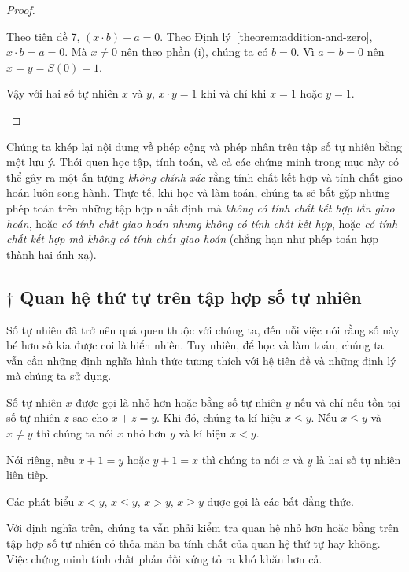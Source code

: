 \begin{proof}
\begin{enumerate}[label={(\roman*)}]
		      Theo tiên đề 7, $(x\cdot b) + a = 0$. Theo Định lý~\ref{theorem:addition-and-zero}, $x\cdot b = a = 0$. Mà $x\ne 0$ nên theo phần (i), chúng ta có $b = 0$. Vì $a = b = 0$ nên $x = y = S(0) = 1$.

		      Vậy với hai số tự nhiên $x$ và $y$, $x\cdot y = 1$ khi và chỉ khi $x = 1$ hoặc $y = 1$.
	\end{enumerate}
\end{proof}

Chúng ta khép lại nội dung về phép cộng và phép nhân trên tập số tự nhiên bằng một lưu ý. Thói quen học tập, tính toán, và cả các chứng minh trong mục này có thể gây ra một ấn tượng \textit{không chính xác} rằng tính chất kết hợp và tính chất giao hoán luôn song hành. Thực tế, khi học và làm toán, chúng ta sẽ bắt gặp những phép toán trên những tập hợp nhất định mà \textit{không có tính chất kết hợp lẫn giao hoán}, hoặc \textit{có tính chất giao hoán nhưng không có tính chất kết hợp}, hoặc \textit{có tính chất kết hợp mà không có tính chất giao hoán} (chẳng hạn như phép toán hợp thành hai ánh xạ).

\subsection{$\dagger$ Quan hệ thứ tự trên tập hợp số tự nhiên}

Số tự nhiên đã trở nên quá quen thuộc với chúng ta, đến nỗi việc nói rằng số này bé hơn số kia được coi là hiển nhiên. Tuy nhiên, để học và làm toán, chúng ta vẫn cần những định nghĩa hình thức tương thích với hệ tiên đề và những định lý mà chúng ta sử dụng.

\begin{definition}
	Số tự nhiên $x$ được gọi là nhỏ hơn hoặc bằng số tự nhiên $y$ nếu và chỉ nếu tồn tại số tự nhiên $z$ sao cho $x + z = y$. Khi đó, chúng ta kí hiệu $x\leq y$. Nếu $x\leq y$ và $x\ne y$ thì chúng ta nói $x$ nhỏ hơn $y$ và kí hiệu $x < y$.

	Nói riêng, nếu $x + 1 = y$ hoặc $y + 1 = x$ thì chúng ta nói $x$ và $y$ là hai số tự nhiên liên tiếp.
\end{definition}

Các phát biểu $x < y$, $x\leq y$, $x > y$, $x\geq y$ được gọi là các bất đẳng thức.

Với định nghĩa trên, chúng ta vẫn phải kiểm tra quan hệ nhỏ hơn hoặc bằng trên tập hợp số tự nhiên có thỏa mãn ba tính chất của quan hệ thứ tự hay không. Việc chứng minh tính chất phản đối xứng tỏ ra khó khăn hơn cả.

